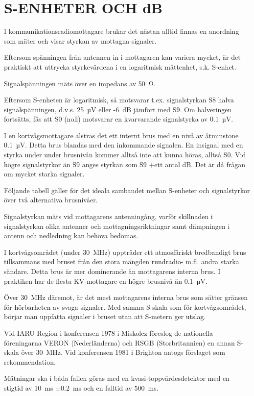 \chapter{S-ENHETER OCH dB}
\label{s-enhet}

I kommunikationsradiomottagare brukar det nästan alltid finnas en
anordning som mäter och visar styrkan av mottagna signaler.

Eftersom spänningen från antennen in i mottagaren kan variera mycket,
är det praktiskt att uttrycka styrkevärdena i en logaritmisk måttenhet,
s.k. S-enhet.

Signalspänningen mäts över en impedans av 50~Ω.

Eftersom S-enheten är logaritmisk, så motsvarar t.ex. signalstyrkan
S8 halva signalspänningen, d.v.s. 25~µV eller -6~dB jämfört med S9. Om
halveringen fortsätts, fås att S0 (noll) motsvarar en kvarvarande
signalstyrka av 0.1~µV.

I en kortvågsmottagare alstras det ett internt brus med en nivå av
åtminstone 0.1~µV.  Detta brus blandas med den inkommande signalen. En
insignal med en styrka under under brusnivån kommer alltså inte att
kunna höras, alltså S0. Vid högre signalstyrkor än S9 anges styrkan
som S9 +ett antal dB. Det är då frågan om mycket starka signaler.

Följande tabell gäller för det ideala sambandet mellan S-enheter och
signalstyrkor över två alternativa brusnivåer.

Signalstyrkan mäts vid mottagarens antenningång, varför skillnaden i
signalstyrkan olika antenner och mottagningsriktningar samt dämpningen
i antenn och nedledning kan behöva bedömas.

I kortvågsområdet (under 30~MHz) uppträder ett atmosfäriskt
bredbandigt brus tillsammans med bruset från den stora mängden
rundradio- m.fl. andra starka sändare.  Detta brus är mer dominerande
än mottagarens interna brus. I praktiken har de flesta KV-mottagare en
högre brusnivå än 0.1~µV.

Över 30~MHz däremot, är det mest mottagarens interna brus som sätter
gränsen för hörbarheten av svaga signaler. Med samma S-skala som för
kortvågsområdet, börjar man uppfatta signaler i bruset utan att
S-metern ger utslag.

Vid IARU Region i-konferensen 1978 i Miskolcz föreslog de nationella
föreningarna VERON (Nederländerna) och RSGB (Storbritannien) en annan
S-skala över 30~MHz.  Vid konferensen 1981 i Brighton antogs förslaget
som rekommendation.

Mätningar ska i båda fallen göras med en kvasi-toppvärdesdetektor
med en stigtid av 10~ms \(\pm\)0.2~ms och en falltid av 500~ms.

